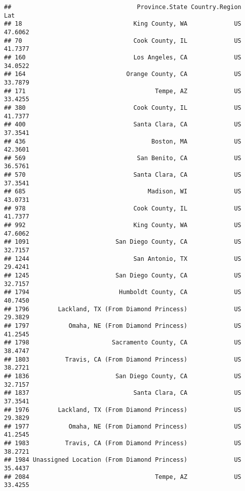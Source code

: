 \documentclass[
]{article}
\newenvironment{Shaded}{\begin{snugshade}}{\end{snugshade}}
\newcommand{\NormalTok}[1]{#1}
\newcommand{\OperatorTok}[1]{\textcolor[rgb]{0.81,0.36,0.00}{\textbf{#1}}}
\newcommand{\StringTok}[1]{\textcolor[rgb]{0.31,0.60,0.02}{#1}}
\begin{document}
\begin{Shaded}
\end{Shaded}

\begin{verbatim}
##                                   Province.State Country.Region     Lat
## 18                               King County, WA             US 47.6062
## 70                               Cook County, IL             US 41.7377
## 160                              Los Angeles, CA             US 34.0522
## 164                            Orange County, CA             US 33.7879
## 171                                    Tempe, AZ             US 33.4255
## 380                              Cook County, IL             US 41.7377
## 400                              Santa Clara, CA             US 37.3541
## 436                                   Boston, MA             US 42.3601
## 569                               San Benito, CA             US 36.5761
## 570                              Santa Clara, CA             US 37.3541
## 685                                  Madison, WI             US 43.0731
## 978                              Cook County, IL             US 41.7377
## 992                              King County, WA             US 47.6062
## 1091                        San Diego County, CA             US 32.7157
## 1244                             San Antonio, TX             US 29.4241
## 1245                        San Diego County, CA             US 32.7157
## 1794                         Humboldt County, CA             US 40.7450
## 1796        Lackland, TX (From Diamond Princess)             US 29.3829
## 1797           Omaha, NE (From Diamond Princess)             US 41.2545
## 1798                       Sacramento County, CA             US 38.4747
## 1803          Travis, CA (From Diamond Princess)             US 38.2721
## 1836                        San Diego County, CA             US 32.7157
## 1837                             Santa Clara, CA             US 37.3541
## 1976        Lackland, TX (From Diamond Princess)             US 29.3829
## 1977           Omaha, NE (From Diamond Princess)             US 41.2545
## 1983          Travis, CA (From Diamond Princess)             US 38.2721
## 1984 Unassigned Location (From Diamond Princess)             US 35.4437
## 2084                                   Tempe, AZ             US 33.4255

\end{verbatim}
\end{document}
